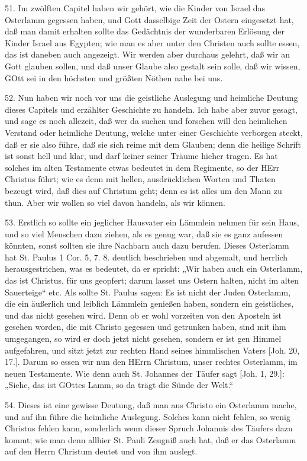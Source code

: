 51. Im zwölften Capitel haben wir gehört, wie die Kinder von Israel das Osterlamm gegessen haben, und Gott dasselbige Zeit der Ostern eingesetzt hat, daß man damit erhalten sollte das Gedächtnis der wunderbaren Erlösung der Kinder Israel aus Egypten; wie man es aber unter den Christen auch sollte essen, das ist daneben auch angezeigt. Wir werden aber durchaus gelehrt, daß wir an Gott glauben
sollen, und daß unser Glaube also gestalt sein solle, daß wir wissen, GOtt sei in den höchsten und größten Nöthen nahe bei uns.

52. Nun haben wir noch vor uns die geistliche Auslegung und heimliche Deutung dieses Capitels und erzählter Geschichte zu handeln. Ich habe aber zuvor gesagt, und sage es noch allezeit, daß wer da suchen und forschen will den heimlichen Verstand oder heimliche Deutung, welche unter einer Geschichte verborgen steckt, daß er sie also führe, daß sie sich reime mit dem Glauben; denn die heilige Schrift ist sonst hell und klar, und darf keiner seiner Träume hieher tragen. Es hat solches im alten Testamente etwas bedeutet in dem Regimente, so der HErr Christus führt; wie es denn mit hellen, ausdrücklichen Worten und Thaten bezeugt wird, daß dies auf Christum geht; denn es ist alles um den Mann zu thun. Aber wir wollen so viel davon handeln, als wir können.

53. Erstlich so sollte ein jeglicher Hausvater ein Lämmlein nehmen für sein Haus, und so viel Menschen dazu ziehen, als es genug war, daß sie es ganz aufessen könnten, sonst sollten sie ihre Nachbarn auch dazu berufen. Dieses Osterlamm hat St. Paulus 1 Cor. 5, 7. 8. deutlich beschrieben und abgemalt, und herrlich herausgestrichen, was es bedeutet, da er spricht: „Wir haben auch ein Osterlamm, das ist Christus, für uns geopfert; darum lasset uns Ostern halten, nicht im alten Sauerteige“ etc. Als sollte St. Paulus sagen: Es ist nicht der Juden Osterlamm, die ein äußerlich und leiblich Lämmlein genießen haben, sondern ein geistliches, und das nicht gesehen wird. Denn ob er wohl vorzeiten von den Aposteln ist gesehen worden, die mit Christo gegessen und getrunken haben, sind mit ihm umgegangen, so wird er doch jetzt nicht gesehen, sondern er ist gen Himmel aufgefahren, und sitzt jetzt zur rechten Hand seines himmlischen Vaters [Joh. 20, 17.]. Darum so essen wir nun den HErrn Christum, unser rechtes Osterlamm, im neuen Testamente. Wie denn auch St. Johannes der Täufer sagt [Joh. 1, 29.]: „Siehe, das ist GOttes Lamm, so da trägt die Sünde der Welt.“

54. Dieses ist eine gewisse Deutung, daß man aus Christo ein Osterlamm mache, und auf ihn führe die heimliche Auslegung. Solches kann nicht fehlen, so wenig Christus fehlen kann, sonderlich wenn dieser Spruch Johannis des Täufers dazu kommt; wie man denn allhier St. Pauli Zeugniß auch hat, daß er das Osterlamm auf den Herrn Christum deutet und von ihm auslegt.

